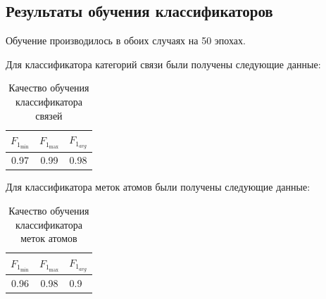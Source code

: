 \subsection{Результаты обучения классификаторов}

Обучение производилось в обоих случаях на 50 эпохах.

Для классификатора категорий связи были получены следующие данные:

\begin{table}[htbp]%
	\centering
	\label{tab:bond_quality}		
		\begin{tabular}{|c|c|c|}
			\hline
			$F_{1_{\min}}$ & $F_{1_{\max}}$ & $F_{1_{avg}}$ \\
			\hline
			0.97 & 0.99 & 0.98 \\
			\hline
		\end{tabular}
	\caption{Качество обучения классификатора связей}
\end{table}

Для классификатора меток атомов были получены следующие данные:

\begin{table}[htbp]%
	\centering
	\label{tab:atom_quality}		
	\begin{tabular}{|c|c|c|}
		\hline
		$F_{1_{\min}}$ & $F_{1_{\max}}$ & $F_{1_{avg}}$ \\
		\hline
		0.96 & 0.98 & 0.9\ \\
		\hline
	\end{tabular}
	\caption{Качество обучения классификатора меток атомов}
\end{table}



% 


